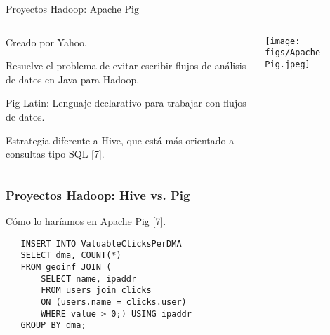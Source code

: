 
\begin{frame}{Proyectos Hadoop: Apache Pig}
 \begin{columns}[T]
    \begin{column}{.75\textwidth}
     \begin{wideitemize}
      \item Creado por Yahoo.
      \item Resuelve el problema de evitar escribir flujos de análisis de datos
      en Java para Hadoop.
      \item Pig-Latin: Lenguaje declarativo para trabajar con flujos de datos.
      \item Estrategia diferente a Hive, que está más orientado a consultas tipo SQL [7].

    \end{wideitemize}
    \end{column}
    \begin{column}{.25\textwidth}
    \vspace*{.7cm}
    \texttt{[image: figs/Apache-Pig.jpeg]}
    \end{column}
  \end{columns}

\end{frame}


\begin{frame}[fragile]
  \frametitle{Proyectos Hadoop: Hive vs. Pig}
  \begin{wideitemize}
      \item Cómo lo haríamos en Apache Pig [7].
  \end{wideitemize}
  \begin{verbatim}
   INSERT INTO ValuableClicksPerDMA
   SELECT dma, COUNT(*)
   FROM geoinf JOIN (
       SELECT name, ipaddr
       FROM users join clicks 
       ON (users.name = clicks.user)
       WHERE value > 0;) USING ipaddr
   GROUP BY dma;
  \end{verbatim}

\end{frame}


